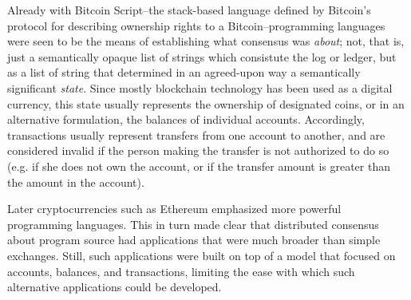 Already with Bitcoin Script--the stack-based language
defined by Bitcoin's protocol for describing ownership rights to a
Bitcoin--programming languages were seen to be the means of establishing what
consensus was \textit{about}; not, that is, just a semantically opaque list of
strings which consistute the log or ledger, but as a list of string that
determined in an agreed-upon way a semantically significant \textit{state}.
Since mostly blockchain technology has been used as a digital currency, this
state usually represents the ownership of designated coins, or in an
alternative formulation, the balances of individual accounts. Accordingly,
transactions usually represent transfers from one account to another, and are
considered invalid if the person making the transfer is not authorized to do so
(e.g. if she does not own the account, or if the transfer amount is greater
than the amount in the account).



Later cryptocurrencies such as Ethereum emphasized more powerful programming
languages. This in turn made clear that distributed consensus about program
source had applications that were much broader than simple exchanges. Still,
such applications were built on top of a model that focused on accounts,
balances, and transactions, limiting the ease with which such alternative
applications could be developed.



